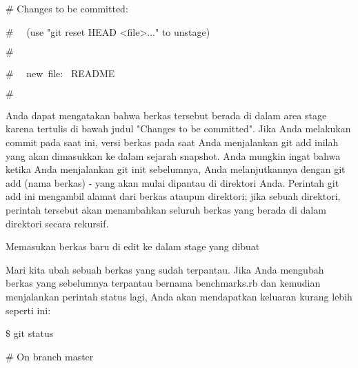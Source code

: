 {\fontsize{14pt}{14pt}\selectfont  $  \#  $ Changes to be committed: \\} \par
\noindent 
{\fontsize{14pt}{14pt}\selectfont  $  \#  $~~ (use "git reset HEAD <file>..." to unstage) \\} \par
\noindent 
{\fontsize{14pt}{14pt}\selectfont  $  \#  $ \\} \par
\noindent 
{\fontsize{14pt}{14pt}\selectfont  $  \#  $~~ new~file:~  README \\} \par
\noindent 
{\fontsize{14pt}{14pt}\selectfont  $  \#  $ \\} \par
\noindent 
{\fontsize{14pt}{14pt}\selectfont Anda dapat mengatakan bahwa berkas tersebut berada di dalam area stage karena tertulis di bawah judul "Changes to be committed". Jika Anda melakukan commit pada saat ini, versi berkas pada saat Anda menjalankan $  $git add $  $inilah yang akan dimasukkan ke dalam sejarah snapshot. Anda mungkin ingat bahwa ketika Anda menjalankan $  $git init $  $sebelumnya, Anda melanjutkannya dengan $  $git add (nama berkas) $  $- yang akan mulai dipantau di direktori Anda. Perintah $  $git add $  $ini mengambil alamat dari berkas ataupun direktori; jika sebuah direktori, perintah tersebut akan menambahkan seluruh berkas yang berada di dalam direktori secara rekursif. \\} \par
\noindent 
{\fontsize{14pt}{14pt}\selectfont Memasukan berkas baru di edit ke dalam stage yang dibuat \\} \par
\vspace{14pt}
\noindent 
{\fontsize{14pt}{14pt}\selectfont Mari kita ubah sebuah berkas yang sudah terpantau. Jika Anda mengubah berkas yang sebelumnya terpantau bernama $  $benchmarks.rb $  $dan kemudian menjalankan perintah $  $status $  $lagi, Anda akan mendapatkan keluaran kurang lebih seperti ini: \\} \par
\vspace{14pt}
\noindent 
{\fontsize{14pt}{14pt}\selectfont  $  \$  $ git status \\} \par
\noindent 
{\fontsize{14pt}{14pt}\selectfont  $  \#  $ On branch master \\} \par
\noindent 
